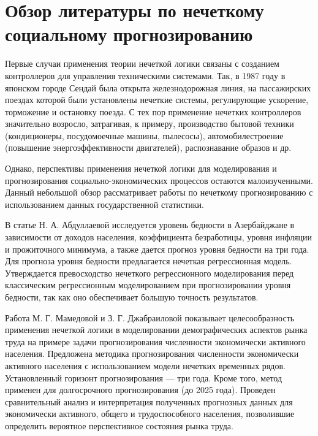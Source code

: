 \newpage
\section{Обзор литературы по нечеткому социальному прогнозированию}

Первые случаи применения теории нечеткой логики связаны с созданием контроллеров для управления техническими системами. Так, в 1987 году в японском городе Сендай была открыта железнодорожная линия, на пассажирских поездах которой были установлены нечеткие системы, регулирующие ускорение, торможение и остановку поезда. С тех пор применение нечетких контроллеров значительно возросло, затрагивая, к примеру, производство бытовой техники (кондиционеры, посудомоечные машины, пылесосы), автомобилестроение (повышение энергоэффективности двигателей), распознавание образов и др.

Однако, перспективы применения нечеткой логики для моделирования и прогнозирования социально-экономических процессов остаются малоизученными. Данный небольшой обзор рассматривает работы по нечеткому прогнозированию с использованием данных государственной статистики. 

В статье  Н. А. Абдуллаевой \cite{Abdullaeva2010} исследуется уровень бедности в Азербайджане в зависимости от доходов населения, коэффициента безработицы, уровня
инфляции и прожиточного минимума, а также дается прогноз
уровня бедности на три года. Для прогноза уровня бедности предлагается нечеткая регрессионная модель. Утверждается превосходство нечеткого регрессионного моделирования перед классическим регрессионным моделированием при прогнозировании уровня бедности, так как оно обеспечивает большую точность результатов. 

Работа М. Г. Мамедовой и З. Г. Джабраиловой \cite{Mamedova2005} 
показывает целесообразность применения нечеткой логики в моделировании демографических аспектов рынка труда на примере задачи прогнозирования численности экономически активного населения. Предложена методика прогнозирования численности экономически активного населения с
использованием модели нечетких временных рядов. Установленный горизонт прогнозирования --- три года. Кроме того, метод применен для долгосрочного прогнозирования (до 2025 года). Проведен сравнительный анализ и интерпретация полученных прогнозных данных для экономически активного, общего и трудоспособного населения, позволившие определить вероятное перспективное состояния рынка труда. 

